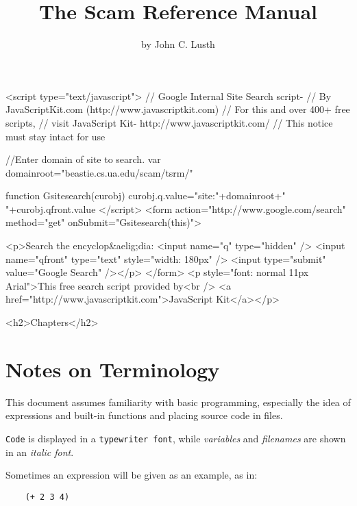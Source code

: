\documentclass{book}
\title{The Scam Reference Manual}
\author{by John C. Lusth}
\begin{document}
\maketitle

\W\htmlrule
\W{}
\W\htmlrule


\begin{rawxml}

<script
    type="text/javascript">
    // Google Internal Site Search script-
    // By JavaScriptKit.com (http://www.javascriptkit.com)
    // For this and over 400+ free scripts,
    // visit JavaScript Kit- http://www.javascriptkit.com/
    // This notice must stay intact for use

    //Enter domain of site to search.
    var domainroot="beastie.cs.ua.edu/scam/tsrm/"

    function Gsitesearch(curobj)
        {
        curobj.q.value="site:"+domainroot+" "+curobj.qfront.value
        }
    </script>
<form
    action="http://www.google.com/search"
    method="get" onSubmit="Gsitesearch(this)">

    <p>Search the encyclop&aelig;dia: 
    <input name="q" type="hidden" />
    <input name="qfront" type="text" style="width: 180px" />
    <input type="submit" value="Google Search" /></p>
    </form>
<p style="font: normal 11px Arial">This free search script provided by<br />
<a href="http://www.javascriptkit.com">JavaScript Kit</a></p>

<h2>Chapters</h2>
\end{rawxml}

\tableofcontents
\setcounter{tocdepth}{2} 

\chapter{Notes on Terminology}
\label{NotesOnTerminology}

This document assumes familiarity with basic programming,
especially the idea of expressions and built-in functions
and placing source code in files.

\verb!Code! is displayed in a \verb!typewriter font!, while {\it variables}
and {\it filenames} are shown in an {\it italic font}.

Sometimes an expression will be given as an example, as in:

\begin{verbatim}
    (+ 2 3 4)
\end{verbatim}
\end{document}
